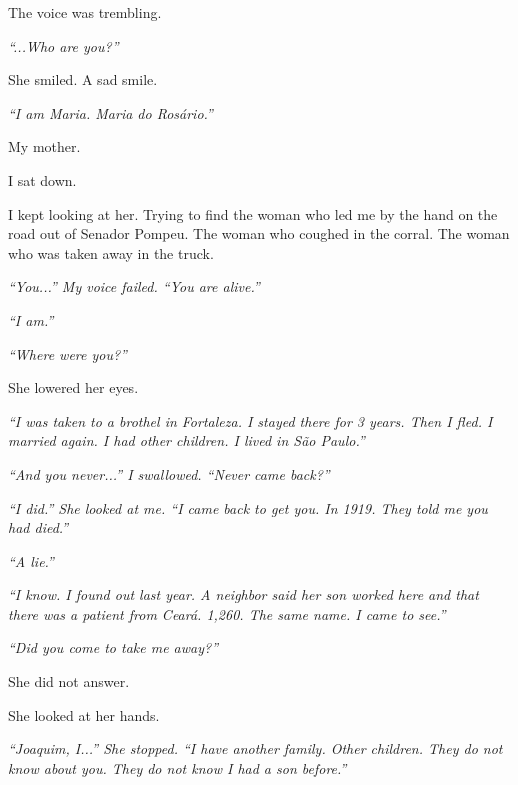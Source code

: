 \noindent The voice was trembling.

\noindent \textit{\textquotedblleft{}...Who are you?\textquotedblright{}}

\noindent She smiled. A sad smile.

\noindent \textit{\textquotedblleft{}I am Maria. Maria do Rosário.\textquotedblright{}}

\noindent My mother.

\noindent I sat down.

\noindent I kept looking at her. Trying to find the woman who led me by the hand on the road out of Senador Pompeu. The woman who coughed in the corral. The woman who was taken away in the truck.

\noindent \textit{\textquotedblleft{}You...\textquotedblright{}\textit{ My voice failed. }\textquotedblleft{}You are alive.\textquotedblright{}}

\noindent \textit{\textquotedblleft{}I am.\textquotedblright{}}

\noindent \textit{\textquotedblleft{}Where were you?\textquotedblright{}}

\noindent She lowered her eyes.

\noindent \textit{\textquotedblleft{}I was taken to a brothel in Fortaleza. I stayed there for 3 years. Then I fled. I married again. I had other children. I lived in São Paulo.\textquotedblright{}}

\noindent \textit{\textquotedblleft{}And you never...\textquotedblright{}\textit{ I swallowed. }\textquotedblleft{}Never came back?\textquotedblright{}}

\noindent \textit{\textquotedblleft{}I did.\textquotedblright{}\textit{ She looked at me. }\textquotedblleft{}I came back to get you. In 1919. They told me you had died.\textquotedblright{}}

\noindent \textit{\textquotedblleft{}A lie.\textquotedblright{}}

\noindent \textit{\textquotedblleft{}I know. I found out last year. A neighbor said her son worked here and that there was a patient from Ceará. 1,260. The same name. I came to see.\textquotedblright{}}

\noindent \textit{\textquotedblleft{}Did you come to take me away?\textquotedblright{}}

\noindent She did not answer.

\noindent She looked at her hands.

\noindent \textit{\textquotedblleft{}Joaquim, I...\textquotedblright{}\textit{ She stopped. }\textquotedblleft{}I have another family. Other children. They do not know about you. They do not know I had a son before.\textquotedblright{}}


